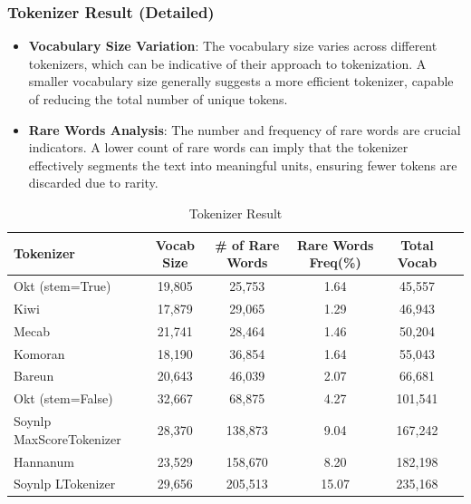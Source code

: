 \documentclass{article}
\begin{document}
\subsubsection{Tokenizer Result (Detailed)}
\begin{itemize}
    \item \textbf{Vocabulary Size Variation}: The vocabulary size varies across different tokenizers, which can be indicative of their approach to tokenization. A smaller vocabulary size generally suggests a more efficient tokenizer, capable of reducing the total number of unique tokens.

    \item \textbf{Rare Words Analysis}: The number and frequency of rare words are crucial indicators. A lower count of rare words can imply that the tokenizer effectively segments the text into meaningful units, ensuring fewer tokens are discarded due to rarity.
\end{itemize}


\begin{table}[htbp]
\centering
\begin{adjustbox}{height=150pt, max width=\textwidth}
\begin{tabular}{|l|c|c|c|c|c|}
\hline
    \textbf{Tokenizer} & \textbf{Vocab Size} & \textbf{\# of Rare Words} & \textbf{Rare Words Freq(\%)} & \textbf{Total Vocab} \\ 
\hline
     Okt (stem=True)& 19,805 & 25,753 & 1.64 & 45,557 \\ 
     Kiwi           & 17,879 & 29,065 & 1.29 & 46,943 \\
    Mecab           & 21,741 & 28,464 & 1.46 & 50,204 \\ 
    Komoran        & 18,190  & 36,854 & 1.64 & 55,043 \\
    Bareun         & 20,643  & 46,039 & 2.07 & 66,681 \\ 
    Okt (stem=False) & 32,667 & 68,875 & 4.27 & 101,541 \\
    Soynlp MaxScoreTokenizer & 28,370    & 138,873 & 9.04  & 167,242\\ 
    Hannanum           & 23,529 & 158,670   & 8.20  & 182,198     \\
    Soynlp LTokenizer   & 29,656 & 205,513  & 15.07 & 235,168     \\ 
\hline
\end{tabular}
\end{adjustbox}
\caption{Tokenizer Result}
\label{tab:vocabulary}
\end{table}
\end{document}
